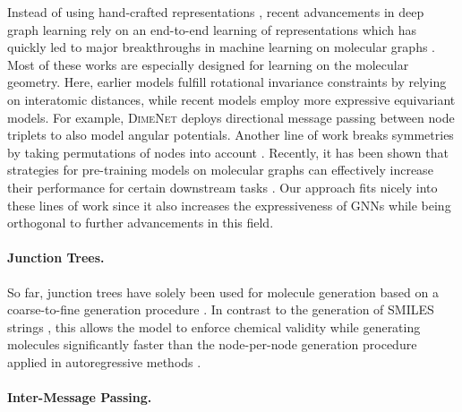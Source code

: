 \documentclass{article}
\begin{document}
Instead of using hand-crafted representations \citep{Bartok/etal/2013}, recent advancements in deep graph learning rely on an end-to-end learning of representations which has quickly led to major breakthroughs in machine learning on molecular graphs \citep{Duvenaud/etal/2015,Gilmer/etal/2017,Schuett/etal/2017,Joergensen/etal/2018,Unke/Meuwly/2019,Chen/etal/2019}.
Most of these works are especially designed for learning on the molecular geometry.
Here, earlier models \citep{Schuett/etal/2017,Gilmer/etal/2017,Joergensen/etal/2018,Unke/Meuwly/2019,Chen/etal/2019} fulfill rotational invariance constraints by relying on interatomic distances, while recent models employ more expressive equivariant models.
For example, \textsc{DimeNet} \citep{Klicpera/etal/2020} deploys directional message passing between node triplets to also model angular potentials.
Another line of work breaks symmetries by taking permutations of nodes into account \citep{Murphy/etal/2019,Hy/etal/2018,Albooyeh/etal/2019}.
Recently, it has been shown that strategies for pre-training models on molecular graphs can effectively increase their performance for certain downstream tasks \citep{Hu/etal/2020a}.
Our approach fits nicely into these lines of work since it also increases the expressiveness of GNNs while being orthogonal to further advancements in this field.

\paragraph{Junction Trees.}\label{par:junction_trees.}

So far, junction trees have solely been used for molecule generation based on a coarse-to-fine generation procedure \citep{Jin/etal/2018,Jin/etal/2019}.
In contrast to the generation of SMILES strings \citep{Gomez/etal/2018}, this allows the model to enforce chemical validity while generating molecules significantly faster than the node-per-node generation procedure applied in autoregressive methods \citep{You/etal/2018}.

\paragraph{Inter-Message Passing.}\label{par:inter-message_passing.}
\end{document}

